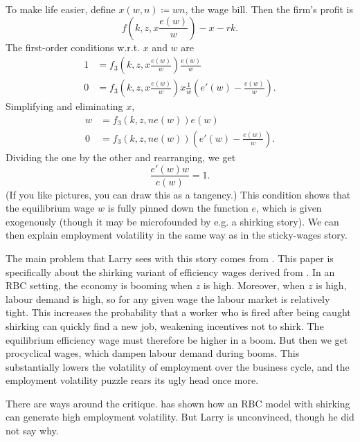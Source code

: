 \documentclass[11pt,letterpaper,reqno,oneside]{article}
\begin{document}
To make life easier, define $x(w,n) \coloneqq wn$, the wage bill. Then the firm's profit is
%
\begin{equation*}
	f\left( k, z, x \frac{e(w)}{w} \right) - x - rk .
\end{equation*}
%
The first-order conditions w.r.t. $x$ and $w$ are
%
\begin{align*}
	1 &=
	f_3\left( k, z, x \frac{e(w)}{w} \right) \frac{e(w)}{w} 
	\\
	0 &=
	f_3\left( k, z, x \frac{e(w)}{w} \right) x \frac{1}{w} 
	\left( e'(w) - \frac{e(w)}{w} \right) .
\end{align*}
%
Simplifying and eliminating $x$,
%
\begin{align*}
	w &=
	f_3\left( k, z, n e(w) \right) e(w) 
	\\
	0 &=
	f_3\left( k, z, n e(w) \right) 
	\left( e'(w) - \frac{e(w)}{w} \right) .
\end{align*}
%
Dividing the one by the other and rearranging, we get
%
\begin{equation*}
	\frac{e'(w)w}{e(w)} = 1 .
\end{equation*}
%
(If you like pictures, you can draw this as a tangency.) This condition shows that the equilibrium wage $w$ is fully pinned down the function $e$, which is given exogenously (though it may be microfounded by e.g. a shirking story). We can then explain employment volatility in the same way as in the sticky-wages story.


The main problem that Larry sees with this story comes from \textcite{Gomme1999}. This paper is specifically about the shirking variant of efficiency wages derived from \textcite{ShapiroStiglitz1984}. In an RBC setting, the economy is booming when $z$ is high. Moreover, when $z$ is high, labour demand is high, so for any given wage the labour market is relatively tight. This increases the probability that a worker who is fired after being caught shirking can quickly find a new job, weakening incentives not to shirk. The equilibrium efficiency wage must therefore be higher in a boom. But then we get procyclical wages, which dampen labour demand during booms. This substantially lowers the volatility of employment over the business cycle, and the employment volatility puzzle rears its ugly head once more.

There are ways around the \textcite{Gomme1999} critique. \textcite{Alexopoulos2004,Alexopoulos2006,Alexopoulos2007} has shown how an RBC model with shirking can generate high employment volatility. But Larry is unconvinced, though he did not say why.
\end{document}
